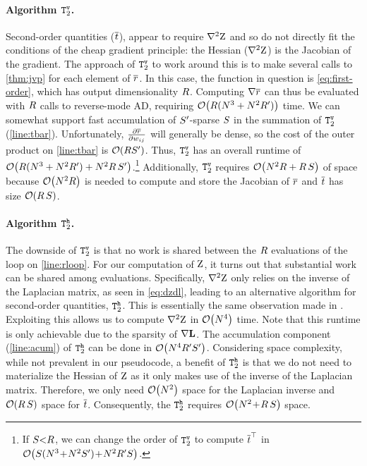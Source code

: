 \documentclass[11pt,a4paper]{article}
\theoremstyle{definition}
\begin{document}
\paragraph{Algorithm {\normalfont $\texttt{T}_2^{\texttt{v}}$}.}
Second-order quantities (${\overline{t}}$), appear to require $\nabla^2 {\mathrm{Z}}$ and so do not directly fit the conditions of the cheap gradient principle: the Hessian ($\nabla^2 {\mathrm{Z}}$) is the Jacobian of the gradient.
The approach of $\texttt{T}_2^{\texttt{v}}$ to work around this is to make several calls to \cref{thm:jvp} for each element of ${\overline{r}}$.
In this case, the function in question is \cref{eq:first-order}, which has output dimensionality ${R}$.
Computing $\nabla{\overline{r}}$ can thus be evaluated with ${R}$ calls to reverse-mode AD, requiring $\mathcal{O}\!\left({R}({N}^3+{N}^2{R'})\right)$ time.
We can somewhat support fast accumulation of ${S'}$-sparse ${S}$ in the summation of $\texttt{T}_2^{\texttt{v}}$ (\cref{line:tbar}).
Unfortunately, $\frac{\partial {\overline{r}}}{\partial {w_{ij}}}$ will generally be dense, so the cost of the outer product on \cref{line:tbar} is $\mathcal{O}\!\left({R} {S'}\right)$.
Thus, $\texttt{T}_2^{\texttt{v}}$
has an overall runtime of $\mathcal{O}\!\left({R}({N}^3+{N}^2{R'})+{N}^2{R}\,{S'}\right)$.\footnote{If ${S}{<}{R}$, we can change the order of $\texttt{T}_2^{\texttt{v}}$ to compute ${\overline{t}}^{\top}$ in $\mathcal{O}\!\left({S}({N}^3\!+\!{N}^2{S'})\!+\!{N}^2{R'}{S}\right)$.}
Additionally, $\texttt{T}_2^{\texttt{v}}$ requires $\mathcal{O}\!\left({N}^2{R}+{R}\,{S}\right)$ of space because $\mathcal{O}\!\left({N}^2{R}\right)$ is needed to compute and store the Jacobian of ${\overline{r}}$ and ${\overline{t}}$ has size $\mathcal{O}\!\left({R}\,{S}\right)$.

\paragraph{Algorithm {\normalfont $\texttt{T}_2^{\texttt{h}}$}.}
The downside of $\texttt{T}_2^{\texttt{v}}$
is that no work is shared between the ${R}$ evaluations of the loop on \cref{line:rloop}.
For our computation of ${\mathrm{Z}}$, it turns out that substantial work can be shared among evaluations.
Specifically, $\nabla^2{\mathrm{Z}}$ only relies on the inverse of the Laplacian matrix, as seen in  \cref{eq:dzdl}, leading to an alternative algorithm for second-order quantities, $\texttt{T}_2^{\texttt{h}}$.
This is essentially the same observation made in \citet{druck09covariance}.
Exploiting this allows us to compute $\nabla^2 {\mathrm{Z}}$ in $\mathcal{O}\!\left({N}^4\right)$ time.
Note that this runtime is only achievable due to the sparsity of $\nabla{\mathbf{L}}$.
The accumulation component (\cref{line:acum}) of $\texttt{T}_2^{\texttt{h}}$
can be done in $\mathcal{O}\!\left({N}^4{R'}{S'}\right)$.
Considering space complexity, while not prevalent in our pseudocode, a benefit of $\texttt{T}_2^{\texttt{h}}$
is that we do not need to materialize the Hessian of ${\mathrm{Z}}$ as it only makes use of the inverse of the Laplacian matrix.
Therefore, we only need $\mathcal{O}\!\left({N}^2\right)$ space for the Laplacian inverse and $\mathcal{O}\!\left({R}\,{S}\right)$ space for ${\overline{t}}$.
Consequently, the $\texttt{T}_2^{\texttt{h}}$ requires $\mathcal{O}\!\left({N}^2\!+\!{R}\,{S}\right)$ space.
\end{document}
